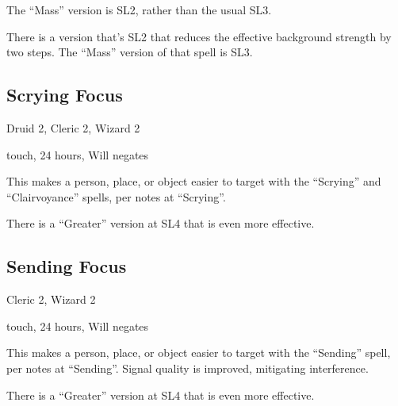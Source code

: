 The ``Mass'' version is SL2, rather than the usual SL3.

There is a version that's SL2 that reduces the effective background
strength by two steps. The ``Mass'' version of that spell is SL3.
%

%
\subsection{Scrying Focus}

Druid 2, Cleric 2, Wizard 2

touch, 24 hours, Will negates

This makes a person, place, or object easier to target with the ``Scrying''
and ``Clairvoyance'' spells, per notes at ``Scrying''.

There is a ``Greater'' version at SL4 that is even more effective.
%

%
\subsection{Sending Focus}

Cleric 2, Wizard 2

touch, 24 hours, Will negates

This makes a person, place, or object easier to target with the ``Sending''
spell, per notes at ``Sending''. Signal quality is improved, mitigating
interference.

There is a ``Greater'' version at SL4 that is even more effective.
%

%
